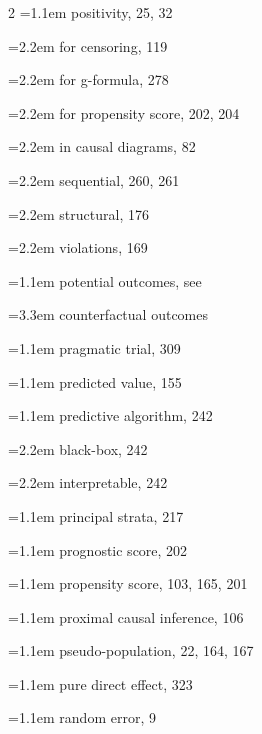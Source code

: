 \begin{multicols}{2}
\hangindent=1.1em positivity, 25, 32\par
\hspace*{1.1em}\hangindent=2.2em for censoring, 119\par
\hspace*{1.1em}\hangindent=2.2em for g-formula, 278\par
\hspace*{1.1em}\hangindent=2.2em for propensity score, 202, 204\par
\hspace*{1.1em}\hangindent=2.2em in causal diagrams, 82\par
\hspace*{1.1em}\hangindent=2.2em sequential, 260, 261\par
\hspace*{1.1em}\hangindent=2.2em structural, 176\par
\hspace*{1.1em}\hangindent=2.2em violations, 169\par
\hangindent=1.1em potential outcomes, see\par
\hspace*{2.2em}\hangindent=3.3em counterfactual outcomes\par
\hangindent=1.1em pragmatic trial, 309\par
\hangindent=1.1em predicted value, 155\par
\hangindent=1.1em predictive algorithm, 242\par
\hspace*{1.1em}\hangindent=2.2em black-box, 242\par
\hspace*{1.1em}\hangindent=2.2em interpretable, 242\par
\hangindent=1.1em principal strata, 217\par
\hangindent=1.1em prognostic score, 202\par
\hangindent=1.1em propensity score, 103, 165, 201\par
\hangindent=1.1em proximal causal inference, 106\par
\hangindent=1.1em pseudo-population, 22, 164, 167\par
\hangindent=1.1em pure direct effect, 323\par
\hangindent=1.1em random error, 9\par

\end{multicols}
